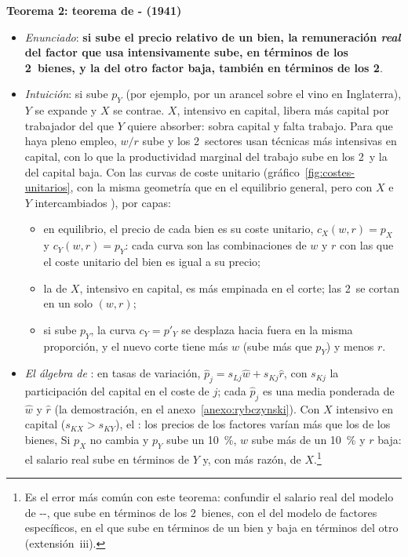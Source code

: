 \documentclass[11pt]{article}
\begin{document}
\textbf{Teorema 2: teorema de - (1941)}

\begin{itemize}
\item \emph{Enunciado}: \textbf{si sube el precio relativo de un bien, la remuneración \emph{real} del factor que usa intensivamente sube, en términos de los 2~bienes, y la del otro factor baja, también en términos de los 2}\nocite{StolperSamuelson1941Protection}.

\item \emph{Intuición}: si sube $p_Y$ (por ejemplo, por un arancel sobre el vino en Inglaterra), $Y$ se expande y $X$ se contrae. $X$, intensivo en capital, libera más capital por trabajador del que $Y$ quiere absorber: sobra capital y falta trabajo. Para que haya pleno empleo, $w/r$ sube y los 2~sectores usan técnicas más intensivas en capital, con lo que la productividad marginal del trabajo sube en los 2~y la del capital baja. Con las curvas de coste unitario (gráfico~\ref{fig:costes-unitarios}, con la misma geometría que en el equilibrio general, pero con $X$ e $Y$ intercambiados ), por capas:
  \begin{itemize}
  \item en equilibrio, el precio de cada bien es su coste unitario, $c_X(w,r)=p_X$ y $c_Y(w,r)=p_Y$: cada curva son las combinaciones de $w$ y $r$ con las que el coste unitario del bien es igual a su precio;
  \item la de $X$, intensivo en capital, es más empinada en el corte; las 2~se cortan en un solo $(w,r)$;
  \item si sube $p_Y$, la curva $c_Y=p'_Y$ se desplaza hacia fuera en la misma proporción, y el nuevo corte tiene más $w$ (sube más que $p_Y$) y menos $r$.
  \end{itemize}
\item \emph{El álgebra de }\nocite{Jones1965Structure} : en tasas de variación, $\hat p_j=s_{Lj}\hat w+s_{Kj}\hat r$, con $s_{Kj}$ la participación del capital en el coste de $j$; cada $\hat p_j$ es una media ponderada de $\hat w$ y $\hat r$ (la demostración, en el anexo~\ref{anexo:rybczynski}). Con $X$ intensivo en capital ($s_{KX}>s_{KY}$), el : los precios de los factores varían más que los de los bienes,
  Si $p_X$ no cambia y $p_Y$ sube un 10~\%, $w$ sube más de un 10~\% y $r$ baja: el salario real sube en términos de $Y$ y, con más razón, de $X$.\footnote{Es el error más común con este teorema: confundir el salario real del modelo de --, que sube en términos de los 2~bienes, con el del modelo de factores específicos, en el que sube en términos de un bien y baja en términos del otro (extensión~iii).}

\end{itemize}
\end{document}
